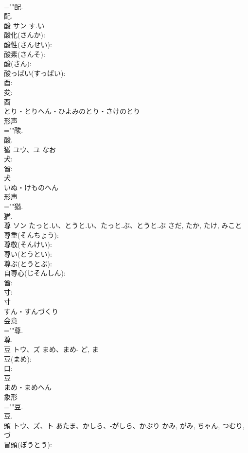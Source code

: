 \documentclass[8pt]{extreport}
\begin{document}
\begin{CJK}{UTF8}{min}
\\	=""配.
\\	配.
\\	酸	サン	す.い		
\\	酸化(さんか): 
\\	酸性(さんせい): 
\\	酸素(さんそ): 
\\	酸(さん): 
\\	酸っぱい(すっぱい): 
\\	酉: 
\\	夋: 
\\	酉	
\\	とり・とりへん・ひよみのとり・さけのとり	
\\	形声 
\\	=""酸.
\\	酸.
\\	猶	ユウ、ユ	なお		
\\	犬: 
\\	酋: 
\\	犬	
\\	いぬ・けものへん	
\\	形声 
\\	=""猶.
\\	猶.
\\	尊	ソン	たっと.い、とうと.い、たっと.ぶ、とうと.ぶ	さだ, たか, たけ, みこと	
\\	尊重(そんちょう): 
\\	尊敬(そんけい): 
\\	尊い(とうとい): 
\\	尊ぶ(とうとぶ): 
\\	自尊心(じそんしん): 
\\	酋: 
\\	寸: 
\\	寸	
\\	すん・すんづくり	
\\	会意 
\\	=""尊.
\\	尊.
\\	豆	トウ、ズ	まめ、まめ-	ど, ま	
\\	豆(まめ): 
\\	口: 
\\	豆	
\\	まめ・まめへん	
\\	象形 
\\	=""豆.
\\	豆.
\\	頭	トウ、ズ、ト	あたま、かしら、-がしら、かぶり	かみ, がみ, ちゃん, つむり, づ	
\\	冒頭(ぼうとう): 

\end{CJK}
\end{document}
